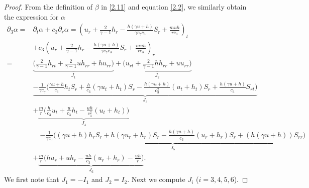 \documentclass[10pt,a4paper]{amsart}
\begin{document}
\begin{proof}
From the definition of $\beta$ in \eqref{2.11} and equation \eqref{2.2}, we similarly obtain the expression for $\alpha$
\begin{align}\label{3.6}
\partial_3\alpha=& \partial_t\alpha + c_3\partial_r \alpha =\left(u_r+\frac{2}{\gamma-1}h_r-\frac{h(\gamma u+h)}{\gamma c_\gamma c_3}S_r+\frac{m uh}{rc_3}\right)_t \nonumber\\
    & +c_3\left(u_r+\frac{2}{\gamma-1}h_r-\frac{h(\gamma u+h)}{\gamma c_\gamma c_3}S_r+\frac{m uh}{rc_3}\right)_r
    \nonumber\\
=&\underbrace{\Big(\frac{2}{\gamma-1}h_{rt}+\frac{2}{\gamma-1}uh_{rr}+hu_{rr}\Big)}_{J_1}
    +\underbrace{\Big(u_{rt}+\frac{2}{\gamma-1}hh_{rr}+uu_{rr}\Big)}_{J_2}
    \nonumber\\
    & \underbrace{-\frac{1}{\gamma c_\gamma}\Big(\frac{\gamma u+h}{c_3}h_tS_r+\frac{h}{c_3}(\gamma u_t+h_t)S_r-\frac{h(\gamma u+h)}{c_3^2}(u_t+h_t)S_r+\frac{h(\gamma u+h)}{c_3}S_{rt}\Big)}_{J_3}
    \nonumber\\
    & +\underbrace{\frac{m}{r}\Big(\frac{h}{c_3}u_t+\frac{u}{c_3}h_t -\frac{uh}{c_3^2}(u_t+h_t)\Big)}_{J_4}
    \nonumber\\
    &\quad\underbrace{-\frac{1}{\gamma c_\gamma}\Big((\gamma u+h)h_rS_r+h(\gamma u_r+h_r)S_r-\frac{h(\gamma u+h)}{c_3}(u_r+h_r)S_r+(h(\gamma u+h))S_{rr}\Big)}_{J_5}
    \nonumber\\
    & +\underbrace{\frac{m}{r}\Big(hu_r+uh_r-\frac{uh}{c_3}(u_r+h_r)-\frac{uh}{r}\Big)}_{J_6}.
\end{align}
We first note that $J_1=-I_1$ and $J_2=I_2$. Next we compute $J_{i}$ ($i=3,4,5,6$).


\end{proof}
\end{document}
